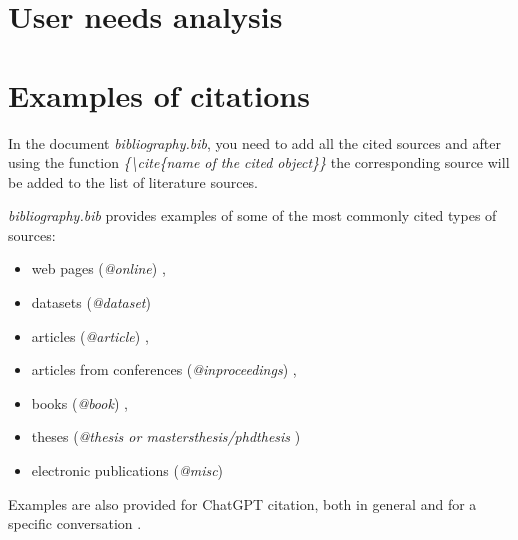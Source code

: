\documentclass[]{VUMIFTemplateClass}
\begin{document}
\section{User needs analysis}





\printbibliography[title = {References and sources}]

\appendix
\renewcommand{\thesection}{Appendix \arabic{section}. }

\section{\phantom{Appendix} Examples of citations}
In the document \textit{bibliography.bib}, you need to add all the cited sources and after using the function \textit{\{\textbackslash cite\{name of the cited object\}\}} the corresponding source will be added to the list of literature sources.


\textit{bibliography.bib} provides examples of some of the most commonly cited types of sources:
\begin{itemize}
    \item web pages (\textit{@online}) \cite{PvzInternetinisPuslapis},
    \item datasets (\textit{@dataset}) \cite{dataset}
    \item articles (\textit{@article}) \cite{PvzStraipsnLt, PvzStraipsnEn}, 
    \item articles from conferences (\textit{@inproceedings}) \cite{PvzKonfLt, PvzKonfEn}, 
    \item books (\textit{@book}) \cite{PvzKnygLt, PvzKnygEn}, 
    \item theses (\textit{@thesis or mastersthesis/phdthesis} \cite{PvzMagistrLt, PvzPhdEn})
    \item electronic publications (\textit{@misc}) \cite{PvzElPubLt, PvzElPubEn}
\end{itemize}

Examples are also provided for ChatGPT citation, both in general \cite{chatgpt_bendrai} and for a specific conversation \cite{chatgpt_pokalbis}.
\end{document}
